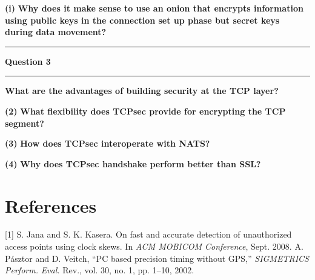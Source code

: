 \documentclass[11pt]{article}
\newcommand\question[2]{\vspace{.25in}\hrule\textbf{#1}\vspace{.5em}\hrule\vspace{.10in}}
\renewcommand\part[1]{\vspace{.10in}\textbf{(#1)}}
\begin{document}
\part{i} \textbf{Why does it make sense to use an onion that encrypts information using public keys in the connection set up phase but secret keys during data movement?}

\question{Question 3}

\part{1} \textbf{What are the advantages of building security at the TCP layer?}

\part{2} \textbf{What flexibility does TCPsec provide for encrypting the TCP segment?}

\part{3} \textbf{How does TCPsec interoperate with NATS?}

\part{4} \textbf{Why does TCPsec handshake perform better than SSL?}

\newpage

\section*{References}
[1]  S. Jana and S. K. Kasera. On fast and accurate detection of
unauthorized access points using \hspace*{1em} clock skews. In \textit{ACM
MOBICOM Conference}, Sept. 2008.
\newline \newline
[2]  A. Pásztor and D. Veitch, “PC based precision timing without GPS,”
\textit{SIGMETRICS Perform.} \hspace*{1em} \textit{Eval.} Rev., vol. 30, no. 1, pp. 1–10, 2002.
\end{document}
